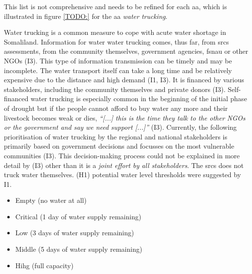
This list is not comprehensive and needs to be refined for each \acrshort{aa}, which is illustrated in figure \ref*{TODO:} for the \acrshort{aa} \textit{water trucking}.


Water trucking is a common measure to cope with acute water shortage in Somaliland. Information for water water trucking comes, thus far, from \acrshort{srcs} assessments, from the community themselves, government agencies, \acrshort{fsnau} or other NGOs (I3). This type of information transmission can be timely and may be incomplete. The water transport itself can take a long time and be relatively expensive due to the distance and high demand (I1, I3). It is financed by various stakeholders, including the community themselves and private donors (I3). Self-financed water trucking is especially common in the beginning of the initial phase of drought but if the people cannot afford to buy water any more and their livestock becomes weak or dies, \textit{“[...] this is the time they talk to the other NGOs or the government and say we need support [...]”} (I3). Currently, the following prioritisation of water trucking by the regional and national stakeholders is primarily based on government decisions and focusses on the most vulnerable communities (I3). This decision-making process could not be explained in more detail by (I3) other than it is a \textit{joint effort by all stakeholders}. The \acrshort{srcs} does not truck water themselves.\newline
(H1) potential water level thresholds were suggested by I1.
\begin{itemize}
    \item Empty (no water at all)
    \item Critical (1 day of water supply remaining)
    \item Low (3 days of water supply remaining)
    \item Middle (5 days of water supply remaining)
    \item Hihg (full capacity)
\end{itemize}
